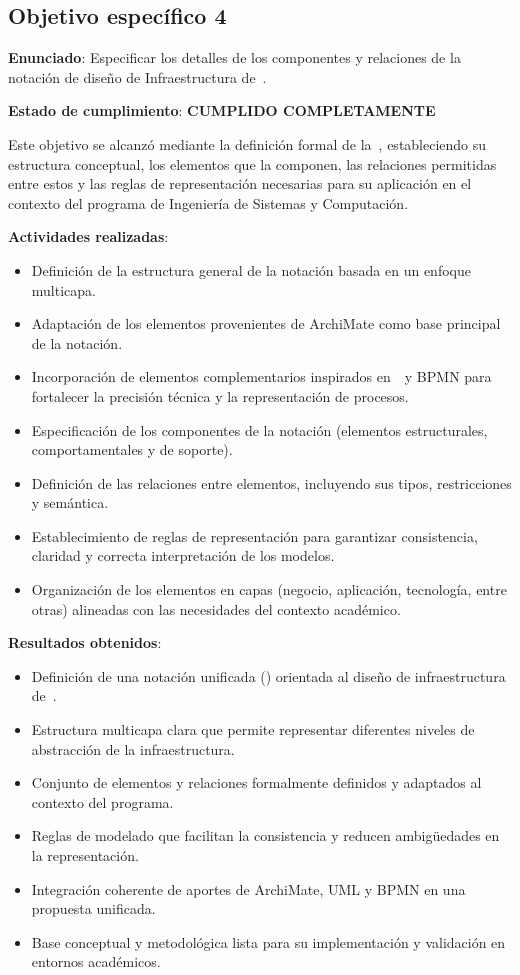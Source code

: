 \subsection{Objetivo específico 4}
\noindent

\textbf{Enunciado}: Especificar los detalles de los componentes y relaciones de la notación de diseño de Infraestructura de~\TI.

\textbf{Estado de cumplimiento}: \textbf{CUMPLIDO COMPLETAMENTE}

Este objetivo se alcanzó mediante la definición formal de la~\NDITI, estableciendo su estructura conceptual, los elementos que la componen, las relaciones permitidas entre estos y las reglas de representación necesarias para su aplicación en el contexto del programa de Ingeniería de Sistemas y Computación.

\textbf{Actividades realizadas}:
\begin{itemize}
    \item Definición de la estructura general de la notación basada en un enfoque multicapa.
    \item Adaptación de los elementos provenientes de ArchiMate como base principal de la notación.
    \item Incorporación de elementos complementarios inspirados en~\UML~y BPMN para fortalecer la precisión técnica y la representación de procesos.
    \item Especificación de los componentes de la notación (elementos estructurales, comportamentales y de soporte).
    \item Definición de las relaciones entre elementos, incluyendo sus tipos, restricciones y semántica.
    \item Establecimiento de reglas de representación para garantizar consistencia, claridad y correcta interpretación de los modelos.
    \item Organización de los elementos en capas (negocio, aplicación, tecnología, entre otras) alineadas con las necesidades del contexto académico.
\end{itemize}

\textbf{Resultados obtenidos}:
\begin{itemize}
    \item Definición de una notación unificada (\NDITI) orientada al diseño de infraestructura de~\TI.
    \item Estructura multicapa clara que permite representar diferentes niveles de abstracción de la infraestructura.
    \item Conjunto de elementos y relaciones formalmente definidos y adaptados al contexto del programa.
    \item Reglas de modelado que facilitan la consistencia y reducen ambigüedades en la representación.
    \item Integración coherente de aportes de ArchiMate, UML y BPMN en una propuesta unificada.
    \item Base conceptual y metodológica lista para su implementación y validación en entornos académicos.
\end{itemize}

